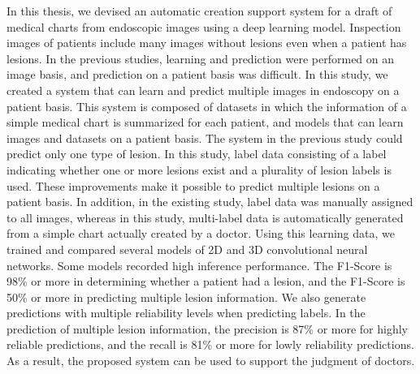 In this thesis, we devised an automatic creation support system for a draft of medical charts from endoscopic images using a deep learning model.
Inspection images of patients include many images without lesions even when a patient has lesions.
In the previous studies, learning and prediction were performed on an image basis, and prediction on a patient basis was difficult.
In this study, we created a system that can learn and predict multiple images in endoscopy on a patient basis.
This system is composed of datasets in which the information of a simple medical chart is summarized for each patient, and models that can learn images and datasets on a patient basis.
The system in the previous study could predict only one type of lesion.
In this study, label data consisting of a label indicating whether one or more lesions exist and a plurality of lesion labels is used.
These improvements make it possible to predict multiple lesions on a patient basis.
In addition, in the existing study, label data was manually assigned to all images, whereas in this study, multi-label data is automatically generated from a simple chart actually created by a doctor.
Using this learning data, we trained and compared several models of 2D and 3D convolutional neural networks. 
Some models recorded high inference performance.
The F1-Score is 98\% or more in determining whether a patient had a lesion, and the F1-Score is 50\% or more in predicting multiple lesion information.
We also generate predictions with multiple reliability levels when predicting labels.
In the prediction of multiple lesion information, the precision is 87\% or more for highly reliable predictions, and the recall is 81\% or more for lowly reliability predictions.
As a result, the proposed system can be used to support the judgment of doctors.
